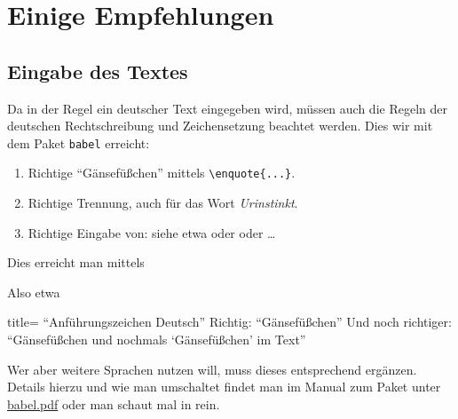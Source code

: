 \section{Einige Empfehlungen}
\subsection{Eingabe des Textes}
%
Da in der Regel ein deutscher Text eingegeben wird, müssen auch die Regeln der deutschen Rechtschreibung und Zeichensetzung beachtet werden.
Dies wir mit dem Paket \texttt{babel} \cite{babel} erreicht:

\begin{enumerate}
\item
Richtige \enquote{Gänsefüßchen} mittels \verb|\enquote{...}|.

\item
Richtige Trennung, auch für das Wort \emph{Urinstinkt}.

\item
Richtige Eingabe von: siehe etwa \og oder \dh oder \etc \ldots
\end{enumerate}
%
Dies erreicht man mittels 
%
%
Also etwa
%
\begin{tcblisting}{title= \enquote{Anführungszeichen Deutsch}}
Richtig: \enquote{Gänsefüßchen}
Und noch richtiger: \enquote{Gänsefüßchen und nochmals \enquote{Gänsefüßchen} im Text}
\end{tcblisting}
%
%
Wer aber weitere Sprachen nutzen will, muss dieses entsprechend ergänzen.
Details hierzu und wie man umschaltet findet man im Manual zum Paket  unter 
\href{https://ctan.ebinger.cc/tex-archive/macros/latex/required/babel/base/babel.pdf}{babel.pdf} oder man schaut mal in \textcite[3.7.2]{voss:2012a} rein.
%
